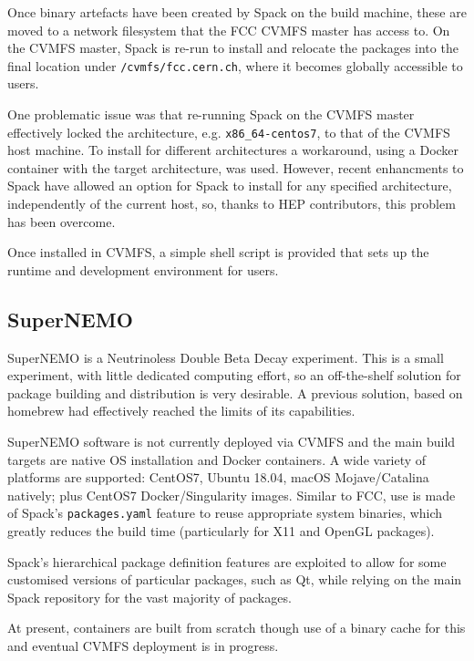 \documentclass{webofc}
\begin{document}
Once binary artefacts have been created by Spack on the build machine,
these are moved to a network filesystem that the FCC CVMFS\cite{CVMFS} master
has access to. On the CVMFS master, Spack is re-run to install and relocate
the packages into the final location under \texttt{/cvmfs/fcc.cern.ch}, where
it becomes globally accessible to users.

One problematic issue was that re-running Spack on the CVMFS master effectively
locked the architecture, e.g. \texttt{x86\_64-centos7}, to that of the CVMFS
host machine. To install for different architectures a workaround, using a
Docker container with the target architecture, was used. However, recent
enhancments to Spack have allowed an option for Spack to install for any
specified architecture, independently of the current host, so, thanks to HEP
contributors, this problem has been overcome.

Once installed in CVMFS, a simple shell script is provided that sets up the
runtime and development environment for users.

\subsection{SuperNEMO}
\label{supernemo}

SuperNEMO\cite{Piquemal2006} is a Neutrinoless Double Beta Decay experiment.
This is a small experiment, with little dedicated computing effort, so
an off-the-shelf solution for package building and distribution is very 
desirable. A previous solution, based on homebrew\cite{homebrew} had effectively
reached the limits of its capabilities.

SuperNEMO software is not currently deployed via CVMFS and the main build targets are
native OS installation and Docker containers. A wide variety of platforms are
supported: CentOS7, Ubuntu 18.04, macOS Mojave/Catalina natively; plus CentOS7
Docker/Singularity images. Similar to FCC, use is made of Spack's
\texttt{packages.yaml} feature to reuse appropriate system binaries, which greatly
reduces the build time (particularly for X11 and OpenGL packages).

Spack's hierarchical package definition features are exploited to allow for
some customised versions of particular packages, such as Qt, while relying on
the main Spack repository for the vast majority of packages.

At present, containers are built from scratch though use of a binary cache for this
and eventual CVMFS deployment is in progress.
\end{document}
